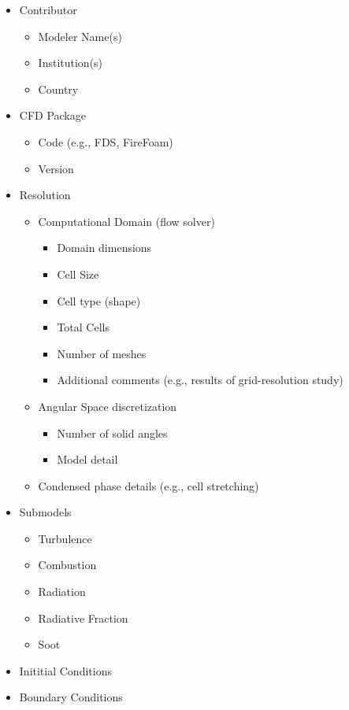 \documentclass[12pt]{article}
\begin{document}
\begin{itemize}[noitemsep]
 \item Contributor
 	\begin{itemize}[noitemsep]
	 \item Modeler Name(s)
	\item Institution(s)
	\item Country
 	\end{itemize}
 \item CFD Package
 	\begin{itemize}[noitemsep]
 	\item Code (e.g., FDS, FireFoam)
	\item Version
 	\end{itemize} 	
 \item Resolution
 	\begin{itemize}[noitemsep]
 	\item Computational Domain (flow solver)
 		\begin{itemize}[noitemsep]
  		\item Domain dimensions
	 	\item Cell Size
	 	\item Cell type (shape)
	 	\item Total Cells
	 	\item Number of meshes
	 	\item Additional comments (e.g., results of grid-resolution study)
	 	\end{itemize}
 	\item Angular Space discretization
 		\begin{itemize}[noitemsep]
  		\item Number of solid angles 
	 	\item Model detail
 	 	\end{itemize}
 	\item Condensed phase details (e.g., cell stretching)
 	\end{itemize}
 \item Submodels
 	\begin{itemize}[noitemsep]
 	\item Turbulence
 	\item Combustion
 	\item Radiation 
 	\item Radiative Fraction
 	\item Soot 
 	\end{itemize}
 \item Inititial Conditions
 \item Boundary Conditions

\end{itemize}
\end{document}
